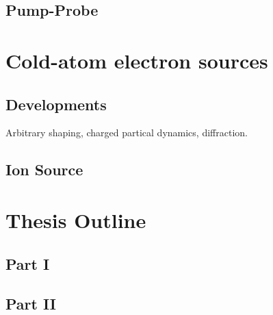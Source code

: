 \subsection{Pump-Probe}

\section{Cold-atom electron sources}

\subsection{Developments}

Arbitrary shaping, charged partical dynamics, diffraction.
\subsection{Ion Source}

\section{Thesis Outline}

\subsection{Part I}

\subsection{Part II}
